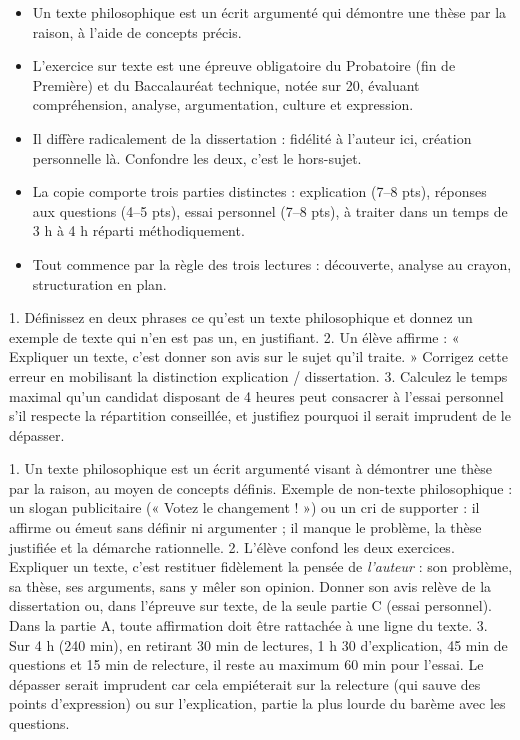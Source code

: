 \documentclass[11pt]{article}
\begin{document}
\begin{aretenir}
\begin{itemize}
\item Un texte philosophique est un écrit argumenté qui démontre une thèse par la raison, à l'aide de concepts précis.
\item L'exercice sur texte est une épreuve obligatoire du Probatoire (fin de Première) et du Baccalauréat technique, notée sur 20, évaluant compréhension, analyse, argumentation, culture et expression.
\item Il diffère radicalement de la dissertation : fidélité à l'auteur ici, création personnelle là. Confondre les deux, c'est le hors-sujet.
\item La copie comporte trois parties distinctes : explication (7--8 pts), réponses aux questions (4--5 pts), essai personnel (7--8 pts), à traiter dans un temps de 3 h à 4 h réparti méthodiquement.
\item Tout commence par la règle des trois lectures : découverte, analyse au crayon, structuration en plan.
\end{itemize}
\end{aretenir}

\begin{exercice}
1. Définissez en deux phrases ce qu'est un texte philosophique et donnez un exemple de texte qui n'en est pas un, en justifiant.
2. Un élève affirme : « Expliquer un texte, c'est donner son avis sur le sujet qu'il traite. » Corrigez cette erreur en mobilisant la distinction explication / dissertation.
3. Calculez le temps maximal qu'un candidat disposant de 4 heures peut consacrer à l'essai personnel s'il respecte la répartition conseillée, et justifiez pourquoi il serait imprudent de le dépasser.
\end{exercice}

\begin{corrige}[Exercice]
1. Un texte philosophique est un écrit argumenté visant à démontrer une thèse par la raison, au moyen de concepts définis. Exemple de non-texte philosophique : un slogan publicitaire (« Votez le changement ! ») ou un cri de supporter : il affirme ou émeut sans définir ni argumenter ; il manque le problème, la thèse justifiée et la démarche rationnelle.
2. L'élève confond les deux exercices. Expliquer un texte, c'est restituer fidèlement la pensée de \emph{l'auteur} : son problème, sa thèse, ses arguments, sans y mêler son opinion. Donner son avis relève de la dissertation ou, dans l'épreuve sur texte, de la seule partie C (essai personnel). Dans la partie A, toute affirmation doit être rattachée à une ligne du texte.
3. Sur 4 h (240 min), en retirant 30 min de lectures, 1 h 30 d'explication, 45 min de questions et 15 min de relecture, il reste au maximum 60 min pour l'essai. Le dépasser serait imprudent car cela empiéterait sur la relecture (qui sauve des points d'expression) ou sur l'explication, partie la plus lourde du barème avec les questions.
\end{corrige}
\end{document}
